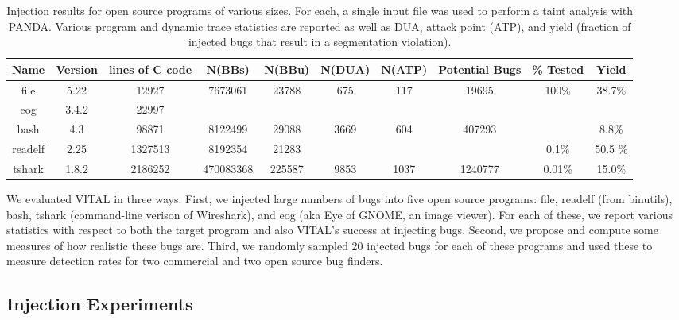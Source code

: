 
\label{section:results}

\begin{table}[t!]
\centering
\begin{tabular}{c|c|c|c|c|c|c|c|c|c} 
Name    & Version & lines of C code & N(BBs)     & N(BBu)   & N(DUA)  & N(ATP) & Potential Bugs & \% Tested & Yield \\\hline
file    & 5.22    & 12927           & 7673061    & 23788    & 675     & 117    & 19695          & 100\%     & 38.7\%  \\
eog     & 3.4.2   & 22997           &            &          &         &        &                &           & \\ 
bash    & 4.3     & 98871           & 8122499    & 29088    & 3669    & 604    & 407293         &           & 8.8\% \\
readelf & 2.25    & 1327513         & 8192354    & 21283    &     &     &          & 0.1\%                  & 50.5 \% \\
tshark  & 1.8.2   & 2186252         & 470083368  & 225587   & 9853    & 1037   & 1240777        & 0.01\%    & 15.0\% \\
\end{tabular}
\caption{Injection results for open source programs of various sizes.
For each, a single input file was used to perform a taint analysis with PANDA.
Various program and dynamic trace statistics are reported as well as DUA, attack point (ATP), and yield (fraction of injected bugs that result in a segmentation violation).}
\label{table:insertion-results}
\end{table}

We evaluated VITAL in three ways.
First, we injected large numbers of bugs into five open source programs: file, readelf (from binutils), bash, tshark (command-line verison of Wireshark), and eog (aka Eye of GNOME, an image viewer).
For each of these, we report various statistics with respect to both the target program and also VITAL's success at injecting bugs.
Second, we propose and compute some measures of how realistic these bugs are.
Third, we randomly sampled 20 injected bugs for each of these programs and used these to measure detection rates for two commercial and two open source bug finders.

\subsection{Injection Experiments}

